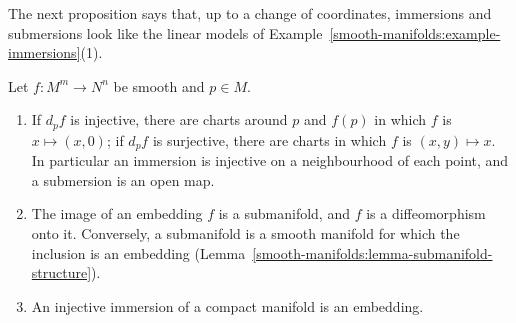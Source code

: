 The next proposition says that, up to a change of coordinates, immersions and submersions look like the linear models of
Example~\ref{smooth-manifolds:example-immersions}(1).

\begin{proposition}\label{smooth-manifolds:proposition-local-forms}
Let $f \colon M^m \to N^n$ be smooth and $p \in M$.
\begin{enumerate}
\item If $d_pf$ is injective, there are charts around $p$ and $f(p)$ in which $f$ is $x \mapsto (x, 0)$; if $d_pf$ is surjective, there are charts in which $f$
is $(x, y) \mapsto x$. In particular an immersion is injective on a neighbourhood of each point, and a submersion is an open map.
\item The image of an embedding $f$ is a submanifold, and $f$ is a diffeomorphism onto it. Conversely, a submanifold is a smooth manifold for which the
inclusion is an embedding (Lemma~\ref{smooth-manifolds:lemma-submanifold-structure}).
\item An injective immersion of a compact manifold is an embedding.
\end{enumerate}
\end{proposition}

